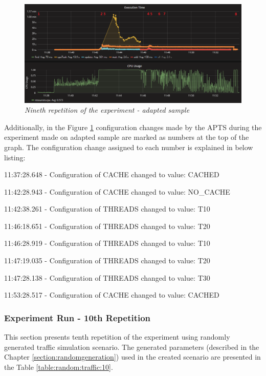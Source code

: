 \documentclass[12pt,a4paper]{article}
\let\tmpone\enumerate
\let\tmptwo\endenumerate
\renewenvironment{enumerate}{\tmpone\addtolength{\itemsep}{-0.4\baselineskip}}{\tmptwo}
\begin{document}
\begin{figure}[!htb]
\centering
\includegraphics[width=1\textwidth]{9-adap}
\caption{\textit{Nineth repetition of the experiment - adapted sample}} \label{figure:random:screen:adapted:9}
\end{figure}

Additionally, in the Figure \ref{figure:random:screen:adapted:9} configuration changes made by the APTS during the experiment made on adapted sample are marked as numbers at the top of the graph. The configuration change assigned to each number is explained in below listing: 

\begin{enumerate}
\item 11:37:28.648 - Configuration of CACHE changed to value: CACHED
\item 11:42:28.943 - Configuration of CACHE changed to value: NO\_CACHE
\item 11:42:38.261 - Configuration of THREADS changed to value: T10
\item 11:46:18.651 - Configuration of THREADS changed to value: T20
\item 11:46:28.919 - Configuration of THREADS changed to value: T10
\item 11:47:19.035 - Configuration of THREADS changed to value: T20
\item 11:47:28.138 - Configuration of THREADS changed to value: T30
\item 11:53:28.517 - Configuration of CACHE changed to value: CACHED
\end{enumerate}





\subsubsection{Experiment Run - 10th Repetition}

This section presents tenth repetition of the experiment using randomly generated traffic simulation scenario. The generated parameters (described in the Chapter \ref{section:randomgeneration}) used in the created scenario are presented in the Table \ref{table:random:traffic:10}.
\end{document}
